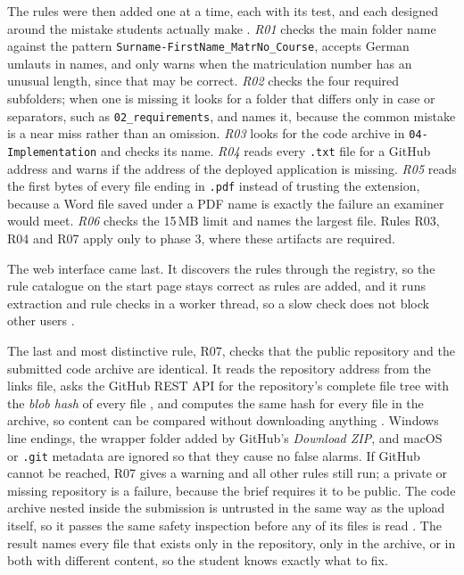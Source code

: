 \documentclass[a4paper,11pt]{article}
\begin{document}
The rules were then added one at a time, each with its test, and each designed
around the mistake students actually make \citep{Combefis2022}.
\textit{R01} checks the main folder name against the pattern
\texttt{Surname-FirstName\_MatrNo\_Course}, accepts German umlauts in names, and
only warns when the matriculation number has an unusual length, since that may be
correct. \textit{R02} checks the four required subfolders; when one is missing it
looks for a folder that differs only in case or separators, such as
\texttt{02\_requirements}, and names it, because the common mistake is a near
miss rather than an omission. \textit{R03} looks for the code archive in
\texttt{04-Implementation} and checks its name. \textit{R04} reads every
\texttt{.txt} file for a GitHub address and warns if the address of the deployed
application is missing. \textit{R05} reads the first bytes of every file ending
in \texttt{.pdf} instead of trusting the extension, because a Word file saved
under a PDF name is exactly the failure an examiner would meet. \textit{R06}
checks the 15\,MB limit and names the largest file. Rules R03, R04 and R07 apply
only to phase 3, where these artifacts are required.

The web interface came last. It discovers the rules through the registry, so the
rule catalogue on the start page stays correct as rules are added, and it runs
extraction and rule checks in a worker thread, so a slow check does not block
other users \citep{FastAPI2025}.

The last and most distinctive rule, R07, checks that the public repository and
the submitted code archive are identical. It reads the repository address from
the links file, asks the GitHub REST API for the repository's complete file tree
with the \textit{blob hash} of every file \citep{GitHubAPI2025}, and computes the
same hash for every file in the archive, so content can be compared without
downloading anything \citep{Chacon2024}. Windows line endings, the wrapper folder
added by GitHub's \textit{Download ZIP}, and macOS or \texttt{.git} metadata are
ignored so that they cause no false alarms. If GitHub cannot be reached, R07
gives a warning and all other rules still run; a private or missing repository
is a failure, because the brief requires it to be public. The code archive nested
inside the submission is untrusted in the same way as the upload itself, so it
passes the same safety inspection before any of its files is read
\citep{OWASP2021}. The result names every file that exists only in the
repository, only in the archive, or in both with different content, so the
student knows exactly what to fix.
\end{document}
